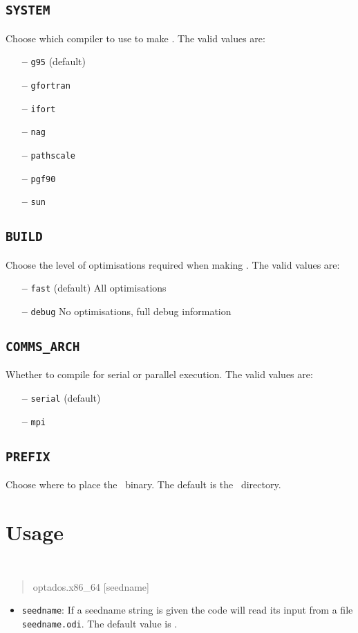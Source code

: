 \documentclass[a4paper,11pt,twoside]{book}
\begin{document}
{\subsection[system]{\tt SYSTEM}

Choose which compiler to use to make \optados. The valid values are:
\begin{itemize}
\item[{\bf --}]  \verb#g95# (default)
\item[{\bf --}]  \verb#gfortran#
\item[{\bf --}]  \verb#ifort#
\item[{\bf --}]  \verb#nag#
\item[{\bf --}]  \verb#pathscale#
\item[{\bf --}]  \verb#pgf90#
\item[{\bf --}]  \verb#sun#
\end{itemize}

\subsection[build]{\tt BUILD}

Choose the level of optimisations required when making \optados.  The valid values are:
\begin{itemize}
\item[{\bf --}]  \verb#fast# (default) All optimisations
\item[{\bf --}]  \verb#debug# No optimisations, full debug information
\end{itemize}

\subsection[comms_arch]{\tt COMMS\_ARCH}

Whether to compile for serial or parallel execution. The valid values are:
\begin{itemize}
\item[{\bf --}]  \verb#serial# (default)
\item[{\bf --}]  \verb#mpi#
\end{itemize}

\subsection[bin_dir]{\tt PREFIX}
Choose where to place the \optados\ binary. The default is the \optados\ directory.


\section{Usage}
{\tt
\begin{quote}
optados.x86\_64  [seedname]
\end{quote} }
\begin{itemize}
\item{  {\tt seedname}: If a seedname string is given the code will read its input from a file {\tt seedname.odi}. The default value is \castep.}
\end{itemize}


}
\end{document}
